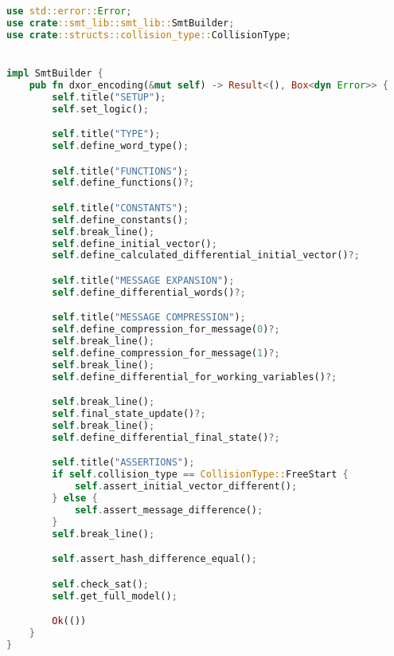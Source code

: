 \begin{lstlisting}[language=rust, caption={smt\_lib/encodings/dxor.rs}]
use std::error::Error;
use crate::smt_lib::smt_lib::SmtBuilder;
use crate::structs::collision_type::CollisionType;


impl SmtBuilder {
	pub fn dxor_encoding(&mut self) -> Result<(), Box<dyn Error>> {
		self.title("SETUP");
		self.set_logic();

		self.title("TYPE");
		self.define_word_type();

		self.title("FUNCTIONS");
		self.define_functions()?;

		self.title("CONSTANTS");
		self.define_constants();
		self.break_line();
		self.define_initial_vector();
		self.define_calculated_differential_initial_vector()?;

		self.title("MESSAGE EXPANSION");
		self.define_differential_words()?;

		self.title("MESSAGE COMPRESSION");
		self.define_compression_for_message(0)?;
		self.break_line();
		self.define_compression_for_message(1)?;
		self.break_line();
		self.define_differential_for_working_variables()?;

		self.break_line();
		self.final_state_update()?;
		self.break_line();
		self.define_differential_final_state()?;

		self.title("ASSERTIONS");
		if self.collision_type == CollisionType::FreeStart {
			self.assert_initial_vector_different();
		} else {
			self.assert_message_difference();
		}
		self.break_line();

		self.assert_hash_difference_equal();

		self.check_sat();
		self.get_full_model();

		Ok(())
	}
}
\end{lstlisting}

